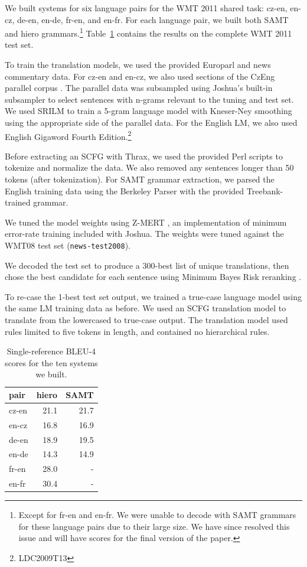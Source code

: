 \documentclass[11pt]{article}
\begin{document}
We built systems for six language pairs for the WMT 2011 shared task:
cz-en, en-cz, de-en, en-de, fr-en, and en-fr.  For each language pair,
we built both SAMT and hiero grammars.\footnote{Except for fr-en and
  en-fr.  We were unable to decode with SAMT grammars for these
  language pairs due to their large size.  We have since resolved this
  issue and will have scores for the final version of the paper.}
Table~\ref{table:results} contains the results on the complete WMT
2011 test set.

To train the translation models, we used the provided Europarl and
news commentary data. For cz-en and en-cz, we also used sections of
the CzEng parallel corpus \cite{czeng:pbml:2009}.  The parallel data
was subsampled using Joshua's built-in subsampler to select sentences
with n-grams relevant to the tuning and test set.  We used SRILM to train a 5-gram language model with Kneser-Ney smoothing using the appropriate side of the parallel data. For the English LM, we also used English Gigaword Fourth Edition.\footnote{LDC2009T13}

Before extracting an SCFG with Thrax, we used the provided Perl
scripts to tokenize and normalize the data. We also removed any
sentences longer than 50 tokens (after tokenization).  For SAMT
grammar extraction, 
we parsed the English training data using the Berkeley Parser
\cite{petrov2006learning} with the
provided Treebank-trained grammar.

We tuned the model weights using Z-MERT \cite{zaidan2009z}, an
implementation of minimum error-rate training included with Joshua.  The weights were tuned against the WMT08 test set ({\tt news-test2008}).

We decoded the test set to produce a 300-best list of unique
translations, then chose the best candidate for each sentence using
Minimum Bayes Risk reranking \cite{kumar2004minimum}.

To re-case the 1-best test set output, we trained a true-case language
model using the same LM training data as before.  We used an SCFG
translation model to translate from the lowercased to true-case
output.  The translation model used rules limited to five tokens in length, and contained no hierarchical rules.

\begin{table}[t]
  \centering
  \begin{tabular}{l|rr}
    pair   & hiero & SAMT \\
    \hline\hline
    cz-en  & 21.1  & 21.7 \\
    en-cz  & 16.8  & 16.9 \\
    de-en  & 18.9  & 19.5 \\
    en-de  & 14.3  & 14.9 \\
    fr-en  & 28.0  & - \\
    en-fr  & 30.4  & - \\
  \end{tabular}
  \caption{Single-reference BLEU-4 scores for the ten systems we
    built.  }
  \label{table:results}
\end{table}
\end{document}
